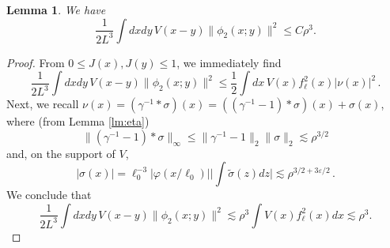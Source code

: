 \documentclass[a4paper,11pt]{article}
\def\eps{\varepsilon}
\def\ph{\varphi}
\newtheorem{lemma}[theorem]{Lemma}
\numberwithin{equation}{section}
\begin{document}
\begin{lemma} \label{lm:phi2}
We have 
\[ \frac{1}{2L^3} \int dx dy \, V(x-y)  \| \phi_2 (x;y) \|^2 \leq C \rho^{3}. \] 
\end{lemma} 
\begin{proof} 
From $0 \leq J(x), J(y) \leq 1$, we immediately find 
\[  \frac{1}{2L^3} \int dx dy \, V(x-y)  \| \phi_2 (x;y) \|^2 \leq  \frac{1}{2} \int dx \, V(x) f_\ell^2 (x) |\nu (x)|^2  \,.\]
Next, we recall $\nu (x) = (\gamma^{-1} * \sigma) (x) = ((\gamma^{-1} -1) * \sigma) (x) + \sigma (x)$, where (from Lemma \ref{lm:eta}) 
\[ \| (\gamma^{-1} -1) * \sigma \|_\infty \leq \| \gamma^{-1} - 1 \|_2 \| \sigma \|_2 \lesssim \rho^{3/2} \]
and, on the support of $V$, 
\[ |\sigma (x)| = \ell_0^{-3} |\ph (x/ \ell_0)| \Big| \int \tilde{\sigma} (z) dz \Big| \lesssim \rho^{3/2+3\eps/2} \,.\]
We conclude that
\[ \frac{1}{2L^3} \int dx dy \, V(x-y)  \| \phi_2 (x;y) \|^2 \lesssim \rho^3\int V(x) f_\ell^2(x)dx \lesssim \rho^3. \]
\end{proof} 
\end{document}
